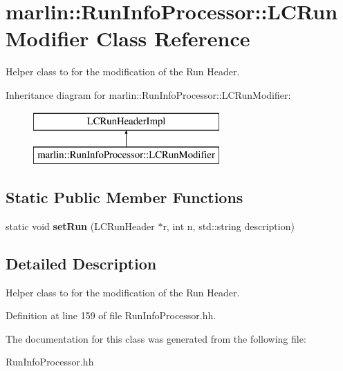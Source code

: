 \section{marlin\-:\-:Run\-Info\-Processor\-:\-:L\-C\-Run\-Modifier Class Reference}
\label{classmarlin_1_1RunInfoProcessor_1_1LCRunModifier}


Helper class to for the modification of the Run Header.  


Inheritance diagram for marlin\-:\-:Run\-Info\-Processor\-:\-:L\-C\-Run\-Modifier\-:\begin{figure}[H]
\begin{center}
\leavevmode
\includegraphics[height=2.000000cm]{classmarlin_1_1RunInfoProcessor_1_1LCRunModifier}
\end{center}
\end{figure}
\subsection*{Static Public Member Functions}
\begin{DoxyCompactItemize}
\item 
static void {\bfseries set\-Run} (L\-C\-Run\-Header $\ast$r, int n, std\-::string description)\label{classmarlin_1_1RunInfoProcessor_1_1LCRunModifier_ad5b4d3ac8439c98e21d6ec66de4ec8ab}

\end{DoxyCompactItemize}


\subsection{Detailed Description}
Helper class to for the modification of the Run Header. 

Definition at line 159 of file Run\-Info\-Processor.\-hh.



The documentation for this class was generated from the following file\-:\begin{DoxyCompactItemize}
\item 
Run\-Info\-Processor.\-hh\end{DoxyCompactItemize}
